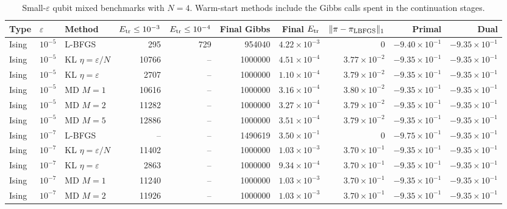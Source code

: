 \begin{table}[t]
\centering
\scriptsize
\caption{Small-$\varepsilon$ qubit mixed benchmarks with $N=4$. Warm-start methods include the Gibbs calls spent in the continuation stages.}
\label{tab:small-eps-warm-lbfgs}
\begin{tabular}{lllrrrrrrr}
\toprule
Type & $\varepsilon$ & Method & $E_{\rm tr}\le10^{-3}$ & $E_{\rm tr}\le10^{-4}$ & Final Gibbs & Final $E_{\rm tr}$ & $\|\pi-\pi_{\rm LBFGS}\|_1$ & Primal & Dual \\
\midrule
Ising & $10^{-5}$ & L-BFGS & 295 & 729 & 954040 & $4.22\times 10^{-3}$ & 0 & $-9.40\times 10^{-1}$ & $-9.35\times 10^{-1}$ \\
Ising & $10^{-5}$ & KL $\eta=\varepsilon/N$ & 10766 & -- & 1000000 & $4.51\times 10^{-4}$ & $3.77\times 10^{-2}$ & $-9.35\times 10^{-1}$ & $-9.35\times 10^{-1}$ \\
Ising & $10^{-5}$ & KL $\eta=\varepsilon$ & 2707 & -- & 1000000 & $1.10\times 10^{-4}$ & $3.79\times 10^{-2}$ & $-9.35\times 10^{-1}$ & $-9.35\times 10^{-1}$ \\
Ising & $10^{-5}$ & MD $M=1$ & 10616 & -- & 1000000 & $3.16\times 10^{-4}$ & $3.80\times 10^{-2}$ & $-9.35\times 10^{-1}$ & $-9.35\times 10^{-1}$ \\
Ising & $10^{-5}$ & MD $M=2$ & 11282 & -- & 1000000 & $3.27\times 10^{-4}$ & $3.79\times 10^{-2}$ & $-9.35\times 10^{-1}$ & $-9.35\times 10^{-1}$ \\
Ising & $10^{-5}$ & MD $M=5$ & 12886 & -- & 1000000 & $3.51\times 10^{-4}$ & $3.79\times 10^{-2}$ & $-9.35\times 10^{-1}$ & $-9.35\times 10^{-1}$ \\
\midrule
Ising & $10^{-7}$ & L-BFGS & -- & -- & 1490619 & $3.50\times 10^{-1}$ & 0 & $-9.75\times 10^{-1}$ & $-9.35\times 10^{-1}$ \\
Ising & $10^{-7}$ & KL $\eta=\varepsilon/N$ & 11402 & -- & 1000000 & $1.03\times 10^{-3}$ & $3.70\times 10^{-1}$ & $-9.35\times 10^{-1}$ & $-9.35\times 10^{-1}$ \\
Ising & $10^{-7}$ & KL $\eta=\varepsilon$ & 2863 & -- & 1000000 & $9.34\times 10^{-4}$ & $3.70\times 10^{-1}$ & $-9.35\times 10^{-1}$ & $-9.35\times 10^{-1}$ \\
Ising & $10^{-7}$ & MD $M=1$ & 11240 & -- & 1000000 & $1.03\times 10^{-3}$ & $3.70\times 10^{-1}$ & $-9.35\times 10^{-1}$ & $-9.35\times 10^{-1}$ \\
Ising & $10^{-7}$ & MD $M=2$ & 11926 & -- & 1000000 & $1.03\times 10^{-3}$ & $3.70\times 10^{-1}$ & $-9.35\times 10^{-1}$ & $-9.35\times 10^{-1}$ \\

\end{tabular}
\end{table}
